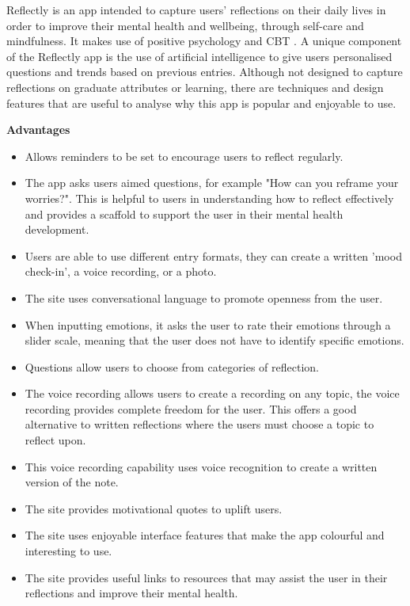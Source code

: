 \documentclass{l4proj}
\begin{document}
Reflectly is an app intended to capture users’ reflections on their daily lives in order to improve their mental health and wellbeing, through self-care and mindfulness. It makes use of positive psychology and CBT \citep{reflectly_app}. A unique component of the Reflectly app is the use of artificial intelligence to give users personalised questions and trends based on previous entries. Although not designed to capture reflections on graduate attributes or learning, there are techniques and design features that are useful to analyse why this app is popular and enjoyable to use. 

\textbf{Advantages}
\begin{itemize}
    \item Allows reminders to be set to encourage users to reflect regularly.
    \item The app asks users aimed questions, for example "How can you reframe your worries?". This is helpful to users in understanding how to reflect effectively and provides a scaffold to support the user in their mental health development.
    \item Users are able to use different entry formats, they can create a written 'mood check-in', a voice recording, or a photo.
    \item The site uses conversational language to promote openness from the user.
    \item When inputting emotions, it asks the user to rate their emotions through a slider scale, meaning that the user does not have to identify specific emotions. 
    \item Questions allow users to choose from categories of reflection.
    \item The voice recording allows users to create a recording on any topic, the voice recording provides complete freedom for the user. This offers a good alternative to written reflections where the users must choose a topic to reflect upon.
    \item This voice recording capability uses voice recognition to create a written version of the note.
    \item The site provides motivational quotes to uplift users.
    \item The site uses enjoyable interface features that make the app colourful and interesting to use.
    \item The site provides useful links to resources that may assist the user in their reflections and improve their mental health.
\end{itemize}
\end{document}
